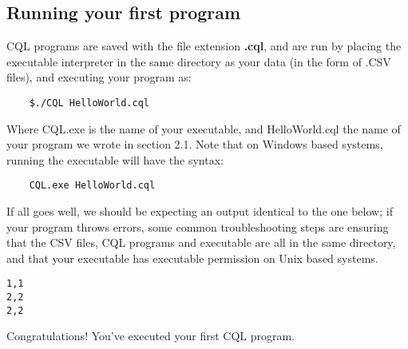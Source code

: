 \subsection{Running your first program}
\begin{normalsize}
CQL programs are saved with the file extension \textbf{.cql}, and are run by placing the executable interpreter in the same directory as your data (in the form of .CSV files), and executing your program as:
\begin{lstlisting}
	$./CQL HelloWorld.cql
\end{lstlisting}
Where CQL.exe is the name of your executable, and HelloWorld.cql the name of your program we wrote in section 2.1. Note that on Windows based systems, running the executable will have the syntax:
\begin{lstlisting}
	CQL.exe HelloWorld.cql
\end{lstlisting}
If all goes well, we should be expecting an output identical to the one below; if your program throws errors, some common troubleshooting steps are ensuring that the CSV files, CQL programs and executable are all in the same directory, and that your executable has executable permission on Unix based systems. 
\end{normalsize}
\begin{lstlisting}[style=framed]
1,1
2,2
2,2
\end{lstlisting}
\begin{normalsize}
Congratulations! You've executed your first CQL program. 
\end{normalsize}